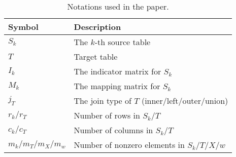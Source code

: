 
\begin{table}[t]
\caption{Notations used in the paper.}
\label{tab:notations}
\vspace{1mm}
\centering
\footnotesize
\begin{tabular}{|l|l|} \hline
\textbf{Symbol} & \textbf{Description} \\ \hline
$S_k$ & The $k$-th source table \\ \hline
$T$ & Target table \\ \hline
$I_k$ & The indicator matrix for $S_k$\\ \hline
$M_k$ & The mapping matrix for $S_k$ \\ \hline
$j_T$          & The join type of $T$ (inner/left/outer/union) \\ \hline
$r_k/r_T$      & Number of rows in $S_k/T$ \\ \hline
$c_k/c_T$      & Number of columns in $S_k/T$ \\ \hline
$m_k/m_T/m_X/m_w$      & Number of nonzero elements in $S_k/T/X/w$ \\ \hline
\end{tabular}
\vspace{-4mm}
\end{table}

\vspace{-5mm}
